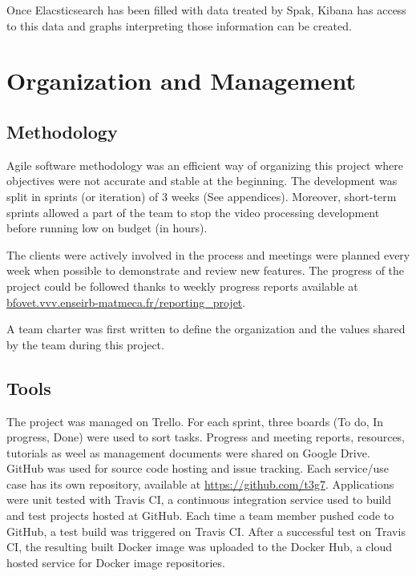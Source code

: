 \documentclass[11pt]{article}
\begin{document}
Once Elacsticsearch has been filled with data treated by Spak, Kibana has access to this data and graphs interpreting those information can be created.

%
%

\section{Organization and Management}

\subsection{Methodology}

Agile software methodology was an efficient way of organizing this project where objectives were not accurate and stable at the beginning. The development was split in sprints (or iteration) of 3 weeks (See appendices).
Moreover, short-term sprints allowed a part of the team to stop the video processing development before running low on budget (in hours).

The clients were actively involved in the process and meetings were planned every week when possible to demonstrate and review new features. The progress of the project could be followed thanks to weekly progress reports available at \url{bfovet.vvv.enseirb-matmeca.fr/reporting_projet}.

A team charter was first written to define the organization and the values shared by the team during this project.

\subsection{Tools}

The project was managed on \textsf{Trello}. For each sprint, three boards (To do, In progress, Done) were used to sort tasks.
Progress and meeting reports, resources, tutorials as weel as management documents were shared on \textsf{Google Drive}.
\textsf{GitHub} was used for source code hosting and issue tracking. Each service/use case has its own repository, available at \url{https://github.com/t3g7}.
Applications were unit tested with \textsf{Travis CI}, a continuous integration service used to build and test projects hosted at \textsf{GitHub}. Each time a team member pushed code to \textsf{GitHub}, a test build was triggered on \textsf{Travis CI}.
After a successful test on \textsf{Travis CI}, the resulting built \textsf{Docker} image was uploaded to the \textsf{Docker Hub}, a cloud hosted service for \textsf{Docker} image repositories.
\end{document}
